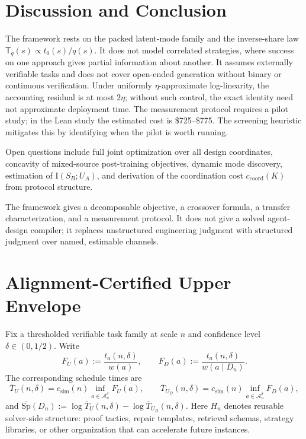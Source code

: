 \documentclass[10pt]{article}
\theoremstyle{paperplain}
\theoremstyle{paperdefinition}
\theoremstyle{paperremark}
\newcommand{\I}{\mathrm{I}}
\newcommand{\cA}{\mathcal{A}}
\newcommand{\Sp}{\mathrm{Sp}}
\begin{document}
\section{Discussion and Conclusion}
\label{sec:discussion}

The framework rests on the packed latent-mode family and the inverse-share law $\mathsf{T}_q(s)\propto t_0(s)/q(s)$. It does not model correlated strategies, where success on one approach gives partial information about another. It assumes externally verifiable tasks and does not cover open-ended generation without binary or continuous verification. Under uniformly $\eta$-approximate log-linearity, the accounting residual is at most $2\eta$; without such control, the exact identity need not approximate deployment time.
The measurement protocol requires a pilot study; in the Lean study the estimated cost is \$725--\$775. The screening heuristic mitigates this by identifying when the pilot is worth running.

Open questions include full joint optimization over all design coordinates, concavity of mixed-source post-training objectives, dynamic mode discovery, estimation of $\I(S_B;U_A)$, and derivation of the coordination cost $c_{\mathrm{coord}}(K)$ from protocol structure.

The framework gives a decomposable objective, a crossover formula, a transfer characterization, and a measurement protocol. It does not give a solved agent-design compiler; it replaces unstructured engineering judgment with structured judgment over named, estimable channels.

\appendix

\section{Alignment-Certified Upper Envelope}
\label{app:upper-envelope}

Fix a thresholded verifiable task family at scale $n$ and confidence level $\delta\in(0,1/2)$. Write
\[
F_U(a):=\frac{t_a(n,\delta)}{w(a)},\qquad
F_D(a):=\frac{t_a(n,\delta)}{w(a\mid D_n)}.
\]
The corresponding schedule times are
\[
\overline T_U(n,\delta)=c_{\mathrm{sim}}(n)\inf_{a\in\cA_n^\delta}F_U(a),
\qquad
\overline T_{U_D}(n,\delta)=c_{\mathrm{sim}}(n)\inf_{a\in\cA_n^\delta}F_D(a),
\]
and $\overline{\Sp}(D_n):=\log \overline T_U(n,\delta)-\log \overline T_{U_D}(n,\delta)$.
Here $H_n$ denotes reusable solver-side structure: proof tactics, repair templates, retrieval schemas, strategy libraries, or other organization that can accelerate future instances.
\end{document}
